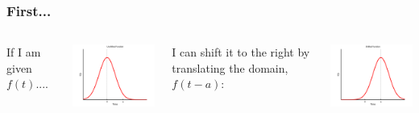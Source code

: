 \begin{frame}
  \frametitle{First...}


  \begin{columns}
  
    If I am given $f(t)$....\\ [1.8em]
    \centerline{\includegraphics[width=6cm]{img/unshifted}}

    {%

      I can shift it to the right by translating the domain, $f(t-a)$:\\
      \centerline{\includegraphics[width=6cm]{img/shifted}}

    }

  \end{columns}
  

\end{frame}

